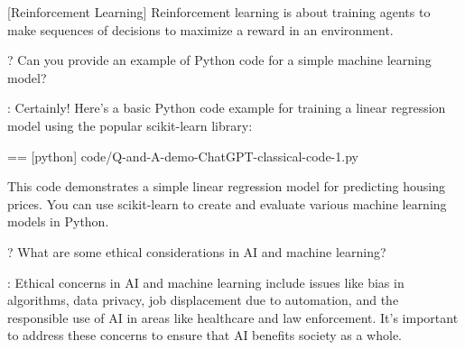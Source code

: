   [Reinforcement Learning]
    Reinforcement learning is about training agents to make sequences of decisions to maximize a reward in an environment.

?
  Can you provide an example of Python code for a simple machine learning model?

:
  Certainly! Here's a basic Python code example for training a linear regression model using the popular scikit-learn library:

  == [python] {code/Q-and-A-demo-ChatGPT-classical-code-1.py}

  This code demonstrates a simple linear regression model for predicting housing prices. You can use scikit-learn to create and evaluate various machine learning models in Python.

?
  What are some ethical considerations in AI and machine learning?

:
  Ethical concerns in AI and machine learning include issues like bias in algorithms, data privacy, job displacement due to automation, and the responsible use of AI in areas like healthcare and law enforcement. It's important to address these concerns to ensure that AI benefits society as a whole.
